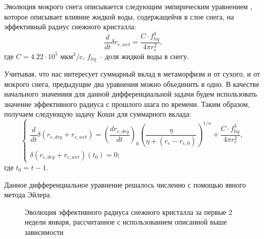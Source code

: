 \documentclass[a4paper, fontsize=14pt]{scrartcl}
\begin{document}
Эволюция мокрого снега описывается следующим эмпирическим уравнением \cite{CLM4.5tech, Brun1989}, которое описывает влияние жидкой воды, содержащейчя в слое снега, на эффективный радиус снежного кристалла:
\begin{equation}
\dfrac{d}{dt} \delta r_{e , wet} = \dfrac{C \cdot f_{liq}^3} {4 \pi r_{e}^2}, \label{sys}
\end{equation}
где $C = 4.22 \cdot 10^{5}$ мкм$^3/$c, $f_{liq}$ -- доля жидкой воды в снегу.

Учитывая, что нас интересует суммарный вклад в метаморфизм и от сухого, и от мокрого снега, предыдущие два уравнения можно объединить в одно. В качестве начального значениия для данной дифференциальной задачи будем использовать значение эффективного радиуса с прошлого шага по времени. Таким образом, получаем следующую задачу Коши для суммарного вклада:
\begin{equation}
    \begin{cases}
        \dfrac{d}{dt} \delta (r_{e , dry} + r_{e , wet}) = {\left( \dfrac{dr_{e , dry}}{dt} \right)}_0 \left(\dfrac{\eta}{\eta + (r_e - r_{e, 0})}\right)^{1 / \kappa} + \dfrac{C \cdot f_{liq}^3} {4 \pi r_{e}^2} ,
        \\
        \delta (r_{e , dry} + r_{e , wet})(t_0) = 0; 
    \end{cases} \label{sysRDS2}
\end{equation}
где $t_0 = t - 1$. 

Данное дифференциальное уравнение решалось численно с помощью явного метода Эйлера.

\begin{figure}[H]
    \caption{Эволюция эффективного радиуса снежного кристалла за первые 2 недели января, рассчитанное с использованием описанной выше зависимости}
    \label{fig:image}
\end{figure}
 
\end{document}
